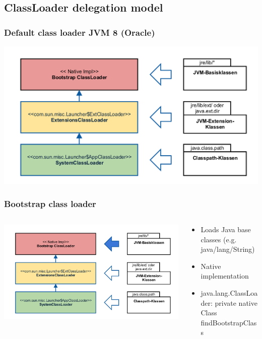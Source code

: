 \documentclass[aspectratio=169]{beamer}
\begin{document}
\subsection{ClassLoader delegation model}

\begin{frame}
	\frametitle{Default class loader JVM 8 (Oracle)}
	\includegraphics[scale=0.1]{assets/classloader-hierachie.png}  %
\end{frame}

\begin{frame}
	\frametitle{Bootstrap class loader}
	\begin{columns}[T] 
		\begin{column}{.46\textwidth}
			\includegraphics[scale=0.06]{assets/classloader-hierachie-bootstrap-active.png}  %
		\end{column}
		\hfill
		\begin{column}{.56\textwidth}

		\begin{itemize}
			\item{Loads Java base classes (e.g. java/lang/String)}
			\item{Native implementation}
			\item{java.lang.ClassLoader: private native Class findBootstrapClass}
		\end{itemize}

		\end{column}
	\end{columns}
\end{frame}
\end{document}
